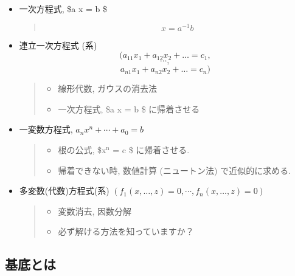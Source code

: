 \documentclass[a4j,12pt]{jarticle}
\begin{document}
\begin{itemize}
\item 一次方程式, \$a x = b \$

\begin{quote}
$$x = a^{-1} b$$
\end{quote}

\item 連立一次方程式 (系)
$$(a_{11} x_1 + a_{12} x_2 + \ldots = c_1,$$$$\cdots,$$
$$a_{n1} x_1 + a_{n2} x_2 + \ldots = c_n)$$

\begin{quote}


\begin{itemize}
\item 線形代数, ガウスの消去法

\item 一次方程式, \$a x = b \$ に帰着させる
\end{itemize}
\end{quote}

\item 一変数方程式, \(a_n x^n + \cdots + a_0 = b\)

\begin{quote}


\begin{itemize}
\item 根の公式, \$x\(^{\text{n}}\) = c \$ に帰着させる.

\item 帰着できない時, 数値計算 (ニュートン法) で近似的に求める.
\end{itemize}
\end{quote}

\item 多変数(代数)方程式(系)
\((f_1(x, \ldots, z) =0, \cdots, f_n(x, \ldots, z) =0)\)

\begin{quote}


\begin{itemize}
\item 変数消去, 因数分解

\item 必ず解ける方法を知っていますか？
\end{itemize}
\end{quote}
\end{itemize}

\subsection{基底とは}
\label{sec:org5cf81f0}
\end{document}
